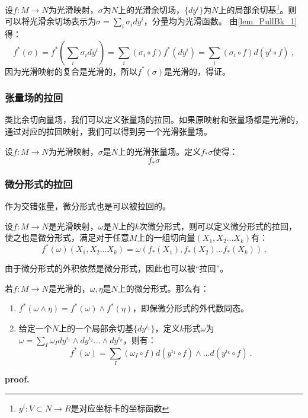 设$f:M\rightarrow N$为光滑映射，$\sigma$为$N$上的光滑余切场，$\{dy^i\}$为$N$上的局部余切基\footnote{$y^i:V\subset N\rightarrow R$是对应坐标卡的坐标函数}。则可以将光滑余切场表示为$\sigma=\sum_i\sigma_idy^i $，分量均为光滑函数。
由\autoref{lem_PullBk_1} 得：
\begin{equation}
f^*(\sigma)=f^*(\sum_i\sigma_idy^i)=\sum_i(\sigma_i\circ f)f^*(dy^i)=\sum_i(\sigma_i\circ f)d(y^i\circ f)~,
\end{equation}
因为光滑映射的复合是光滑的，所以$f^*(\sigma)$是光滑的，得证。
\subsubsection{张量场的拉回}
类比余切向量场，我们可以定义张量场的拉回。如果原映射和张量场都是光滑的，通过对应的拉回映射，我们可以得到另一个光滑张量场。
\begin{definition}{}
设$f:M\rightarrow N$为光滑映射，$\sigma$是$N$上的光滑张量场。定义$f_*\sigma$使得：
\begin{equation}
f_*\sigma
\end{equation}
\end{definition}

\subsubsection{微分形式的拉回}
作为交错张量，微分形式也是可以被拉回的。
\begin{definition}{}
设$f:M\rightarrow N$是光滑映射，$\omega$是$N$上的$k$次微分形式，则可以定义微分形式的拉回，使之也是微分形式，满足对于任意$M$上的一组切向量$(X_1,X_2...X_k)$有：
\begin{equation}
f^*(\omega)(X_1,X_2...X_k)=\omega(f_*(X_1),f_*(X_2)...f_*(X_k))~.
\end{equation}
\end{definition}
由于微分形式的外积依然是微分形式，因此也可以被“拉回”。
\begin{theorem}{}\label{the_PullBk_1}
若$f:M\rightarrow N$是光滑的，$\omega,\eta$是$N$上的微分形式。那么有：
\begin{enumerate}
\item $f^*(\omega\wedge \eta)=f^*(\omega)\wedge f^*(\eta)$，即保微分形式的外代数同态。
\item 给定一个$N$上的一个局部余切基$\{dy^{i_1}\}$，定义$k$形式$\omega$为$\omega=\sum_I\omega_I dy^{i_1}\wedge dy^{i_2}...\wedge dy^{i_k}$，则有：
\begin{equation}
f^*(\omega)=\sum_I (\omega_I\circ f)d(y^{i_1}\circ f)\wedge...d(y^{i_k}\circ f)~.
\end{equation}
\end{enumerate}
\end{theorem}
\textbf{proof.}


